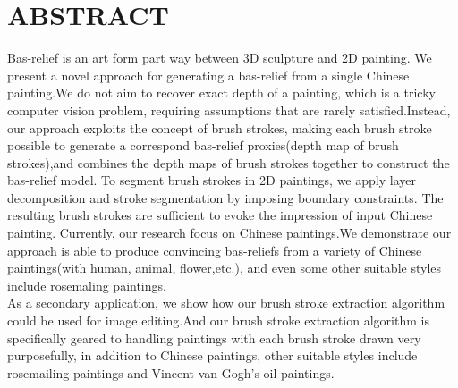 \section*{\centering ABSTRACT}
Bas-relief is an art form part way between 3D sculpture and 2D painting. We present a novel approach for generating a bas-relief from a single Chinese painting.We do not aim to recover exact depth of a painting, which is a tricky computer vision problem, requiring assumptions that are rarely satisfied.Instead, our approach exploits the concept of brush strokes, making each brush stroke possible to generate a correspond bas-relief proxies(depth map of brush strokes),and combines the depth maps of brush strokes together to construct the bas-relief model. To segment brush strokes in 2D paintings, we apply layer decomposition and stroke segmentation by imposing boundary constraints. The resulting brush strokes are sufficient to evoke the impression of input Chinese painting. Currently, our research focus on Chinese paintings.We demonstrate our approach is able to produce convincing bas-reliefs from a variety of Chinese paintings(with human, animal, flower,etc.), and even some other suitable styles include rosemaling paintings. \\
As a secondary application, we show how our brush stroke extraction algorithm could be used for image editing.And our brush stroke extraction algorithm is specifically geared to handling paintings with each brush stroke drawn very purposefully, in addition to Chinese paintings, other suitable styles include rosemailing paintings and Vincent van Gogh's oil paintings.

\newpage


 

